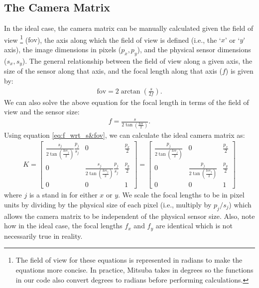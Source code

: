 \documentclass[11pt, letterpaper]{extarticle} %
\begin{document}
\subsection{The Camera Matrix} \label{subsec:the_camera_matrix}
In the ideal case, the camera matrix can be manually calculated given the field of view \footnote{The field of view for these equations is represented in radians to make the equations more concise. In practice, Mitsuba takes in degrees so the functions in our code also convert degrees to radians before performing calculations.} ($\text{fov}$), the axis along which the field of view is defined (i.e., the `$x$' or `$y$' axis), the image dimensions in pixels ($p_x, p_y$), and the physical sensor dimensions ($s_x, s_y$). The general relationship between the field of view along a given axis, the size of the sensor along that axis, and the focal length along that axis ($f$) is given by:
\begin{align}\label{eq:fov_wrt_s&f}
    \text{fov} = 2 \arctan \left( \frac{s}{2f} \right).
\end{align}
We can also solve the above equation for the focal length in terms of the field of view and the sensor size:
\begin{align}\label{eq:f_wrt_s&fov}
    f = \frac{s}{2 \tan \left( \frac{\text{fov}}{2} \right)}.
\end{align}
Using equation \ref{eq:f_wrt_s&fov}, we can calculate the ideal camera matrix as:
\begin{align}
    K =
    \begin{bmatrix}
        \frac{s_j}{2 \tan \left( \frac{\text{fov}_j}{2} \right)} \frac{p_j}{s_j} & 0 & \frac{p_x}{2} \\
        0 & \frac{s_j}{2 \tan \left( \frac{\text{fov}_j}{2} \right)} \frac{p_j}{s_j} & \frac{p_y}{2} \\
        0 & 0 & 1
    \end{bmatrix}
    =
    \begin{bmatrix}
        \frac{p_j}{2 \tan \left( \frac{\text{fov}_j}{2} \right)} & 0 & \frac{p_x}{2} \\
        0 & \frac{p_j}{2 \tan \left( \frac{\text{fov}_j}{2} \right)} & \frac{p_y}{2} \\
        0 & 0 & 1
    \end{bmatrix}
\end{align}
where $j$ is a stand in for either $x$ or $y$. We scale the focal lengths to be in pixel units by dividing by the physical size of each pixel (i.e., multiply by $p_j/s_j$) which allows the camera matrix to be independent of the physical sensor size. Also, note how in the ideal case, the focal lengths $f_x$ and $f_y$ are identical which is not necessarily true in reality.
\end{document}
